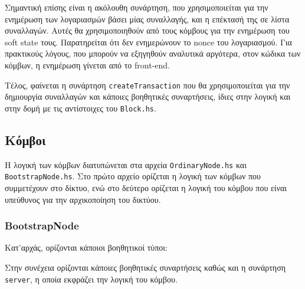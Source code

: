 \documentclass{article}
\newcommand{\eng}[1]{\foreignlanguage{english}{#1}} %
\begin{document}
    

Σημαντική επίσης είναι η ακόλουθη συνάρτηση, που χρησιμοποιείται για την ενημέρωση των
λογαριασμών βάσει μίας συναλλαγής, και η επέκτασή της σε λίστα συναλλαγών. Αυτές θα
χρησιμοποιηθούν από τους κόμβους για την ενημέρωση του \eng{soft state} τους.
Παρατηρείται ότι δεν ενημερώνουν το \eng{nonce} του λογαριασμού. Για πρακτικούς
λόγους, που μπορούν να εξηγηθούν αναλυτικά αργότερα, στον κώδικα των κόμβων,
η ενημέρωση γίνεται από το \eng{front-end}.

    

Τέλος, φαίνεται η συνάρτηση \texttt{\eng{createTransaction}} που θα χρησιμοποιείται
για την δημιουργία συναλλαγών και κάποιες βοηθητικές συναρτήσεις, ίδιες στην λογική
και στην δομή με τις αντίστοιχες του \texttt{\eng{Block.hs}}.



\subsection{Κόμβοι}

Η λογική των κόμβων διατυπώνεται στα αρχεία \texttt{\eng{OrdinaryNode.hs}} και
\texttt{\eng{BootstrapNode.hs}}. Στο πρώτο αρχείο ορίζεται η λογική των κόμβων
που συμμετέχουν στο δίκτυο, ενώ στο δεύτερο ορίζεται η λογική του κόμβου που
είναι υπεύθυνος για την αρχικοποίηση του δικτύου.

\subsubsection{\eng{BootstrapNode}}

Κατ'αρχάς, ορίζονται κάποιοι βοηθητικοί τύποι:

    

Στην συνέχεια ορίζονται κάποιες βοηθητικές συναρτήσεις καθώς και η συνάρτηση
\texttt{\eng{server}}, η οποία εκφράζει την λογική του κόμβου.
\end{document}
